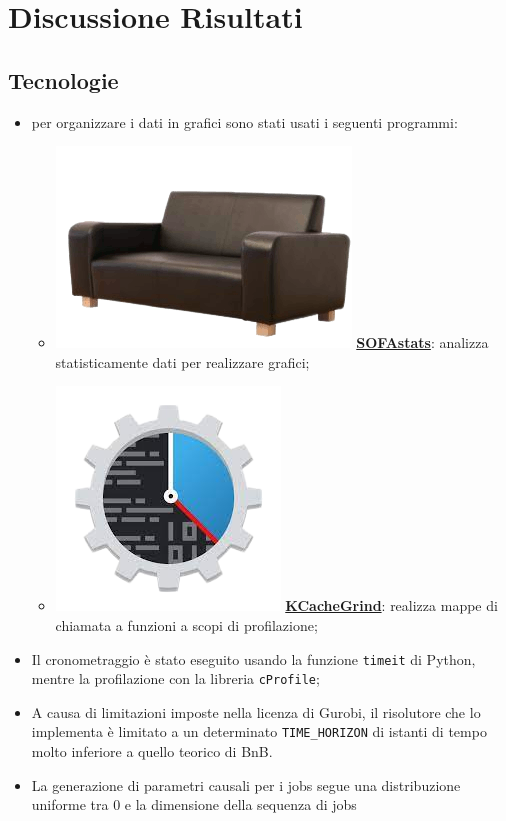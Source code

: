 \documentclass[compress]{beamer}
\begin{document}
\section{Discussione Risultati}

    \subsection{Tecnologie}
    \begin{frame}{\subsecname}
        \begin{itemize}
            \item per organizzare i dati in grafici sono stati usati i seguenti programmi:
            \begin{itemize}
                \item \includegraphics[scale=0.1]{figs/sofastatsLogo.png} \href{https://www.sofastatistics.com/home.php}{\textbf{SOFAstats}}:
                analizza statisticamente dati per realizzare grafici;
                \item \includegraphics[scale=0.1]{figs/kCacheGrindLogo-removebg-preview.png} \href{https://kcachegrind.github.io/html/Home.html}{\textbf{KCacheGrind}}: realizza mappe di chiamata 
                a funzioni a scopi di profilazione;
            \end{itemize}
            \item Il cronometraggio è stato eseguito usando la funzione \texttt{timeit} di Python,
            mentre la profilazione con la libreria \texttt{cProfile};
            \item A causa di limitazioni imposte nella licenza di Gurobi, il risolutore che lo
            implementa è limitato a un determinato \texttt{TIME\_HORIZON} di istanti di tempo
            molto inferiore a quello teorico di BnB.
            \item La generazione di parametri causali per i jobs segue una distribuzione uniforme tra
            0 e la dimensione della sequenza di jobs

        \end{itemize}
    \end{frame}
\end{document}
